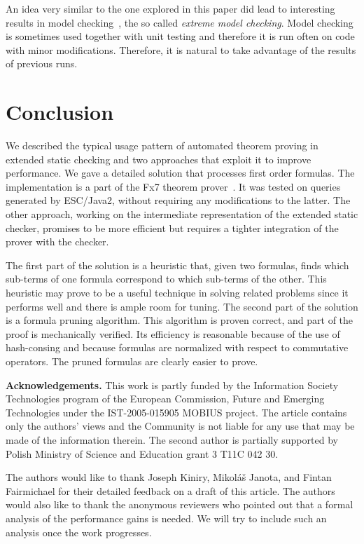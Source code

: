 \documentclass{llncs}
\def\escjava{\hskip 0pt\hbox{ESC/Java2}}
\begin{document}
An idea very similar to the one explored in this paper did
lead to interesting results in model checking~\cite{henzinger2004emc},
the so called \emph{extreme model checking}. Model checking
is sometimes used together with unit testing and therefore
it is run often on code with minor modifications.
Therefore, it is natural to take advantage of the results
of previous runs.

\section{Conclusion}

We described the typical usage pattern of automated theorem
proving in extended static checking and two approaches that
exploit it to improve performance. We gave a detailed solution 
that processes first order formulas. The implementation
is a part of the Fx7 theorem prover~\cite{fx7}. It was tested
on queries generated by \escjava, without requiring any
modifications to the latter. The other approach, working on
the intermediate representation of the extended static checker,
promises to be more efficient but requires a tighter integration
of the prover with the checker.

The first part of the solution is a heuristic that, given
two formulas, finds which sub-terms of one formula correspond
to which sub-terms of the other. This heuristic may prove to be
a useful technique in solving related problems since it
performs well and there is ample room for tuning. The second
part of the solution is a formula pruning algorithm. This
algorithm is proven correct, and part of the proof is 
mechanically verified. Its efficiency is reasonable because
of the use of hash-consing and because formulas are normalized
with respect to commutative operators. The pruned formulas 
are clearly easier to prove.

\bigskip{}\noindent\textbf{Acknowledgements.}
This work is partly funded by the Information Society Technologies 
program of the European Commission, Future and Emerging
Technologies under the IST-2005-015905 MOBIUS project. 
The article contains only the authors' views and the Community
is not liable for any use that may be made of the information
therein. The second author is partially supported by Polish 
Ministry of Science and Education grant 3 T11C 042 30.


The authors would like to thank Joseph Kiniry, Mikol\'a\v s
Janota, and Fintan Fairmichael for their detailed feedback
on a draft of this article. The authors would also like to
thank the anonymous reviewers who pointed out that a formal
analysis of the performance gains is needed. We will try to
include such an analysis once the work progresses.


\end{document}
